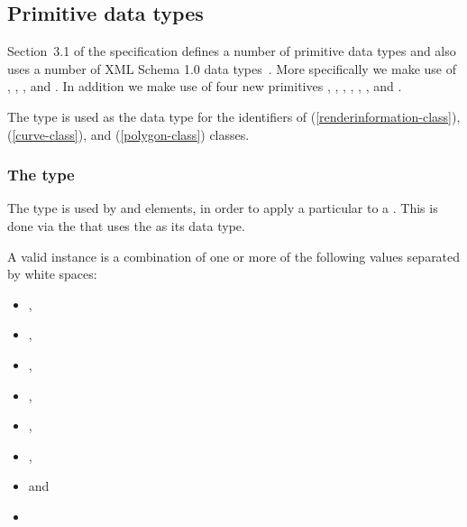 \subsection{Primitive data types}
\label{primtypes}

Section~3.1 of the \sbmlthreecore specification defines a number of primitive
data types and also uses a number of XML Schema 1.0 data types~\citep{biron:2000}.
More specifically we make use of , ,
,  and . 
In addition we make use of
four new primitives , , 
, , ,  
,  and .

The  type is used as the data type for the identifiers of \RenderInformation
(\ref{renderinformation-class}), \Curve (\ref{curve-class}),  and \Polygon
(\ref{polygon-class}) classes. 

\subsubsection{The  type}
\label{style-type}
The type  is used by \LocalStyle and \GlobalStyle elements, in order
to apply a particular \Style to a \GraphicalObject. This is done via the 
that uses the  as its data type. 

A valid  instance is a combination of one or more of the following 
values separated by white spaces:

\begin{itemize}
 \item {},
 \item {},
 \item {}, 
 \item {},
 \item {}, 
 \item {}, 
 \item {} and 
 \item {}
\end{itemize}


